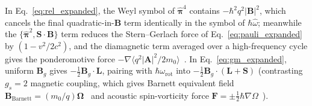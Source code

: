 \documentclass[aps,prd,onecolumn,tightenlines,nofootinbib,notitlepage,10pt,floatfix]{revtex4-2}
\theoremstyle{indentedtheorem}
\begin{document}
In Eq.~\eqref{eq:rel_expanded}, the Weyl symbol of $\hat{\boldsymbol{\pi}}^4$ contains $-\hbar^2 q^2|\mathbf{B}|^2$, which cancels the final quadratic-in-$\mathbf{B}$ term identically in the symbol of $\hbar\hat{\omega}$; meanwhile the $\{\hat{\boldsymbol{\pi}}^2,\mathbf{S}\cdot\mathbf{B}\}$ term reduces the Stern--Gerlach force of Eq.~\eqref{eq:pauli_expanded} by $(1-v^2/2c^2)$, and the diamagnetic term averaged over a high-frequency cycle gives the ponderomotive force $-\nabla\langle q^2|\mathbf{A}|^2/2m_0\rangle$~\citep{Zhu2023Ionization}. In Eq.~\eqref{eq:gm_expanded}, uniform $\mathbf{B}_g$ gives $-\tfrac{1}{2}\mathbf{B}_g\cdot\mathbf{L}$, pairing with $\hbar\omega_\text{rot}$ into $-\tfrac{1}{2}\mathbf{B}_g\cdot(\mathbf{L}+\mathbf{S})$ (contrasting $g_s=2$ magnetic coupling, which gives Barnett equivalent field $\mathbf{B}_\text{Barnett}=(m_0/q)\boldsymbol{\Omega}$~\citep{Barnett1915,Demirel2015Measurement,Danner2020Spin} and acoustic spin-vorticity force $\mathbf{F}=\pm\tfrac{1}{2}\hbar\nabla\Omega$~\citep{Matsuo2013Mechanical}).
\end{document}

